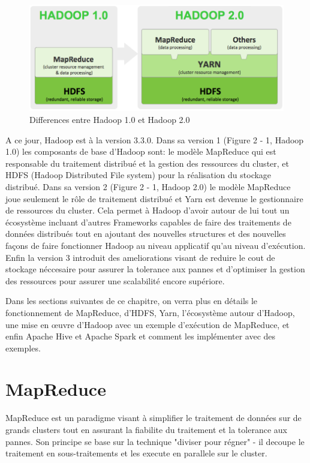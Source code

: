 \documentclass[12pt,french]{book}
\begin{document}
	\newpage
	\begin{figure}[t]
		\centering
		\includegraphics[width=\linewidth]{hadoop1vshadoop2}
		\caption[Differences entre Hadoop 1.0 et Hadoop 2.0]{Differences entre Hadoop 1.0 et Hadoop 2.0\footnotemark}
	\end{figure}


A ce jour, Hadoop est à la version 3.3.0.
Dans sa version 1 (Figure 2 - 1, Hadoop 1.0) les composants de base d’Hadoop sont: le modèle MapReduce qui est responsable du traitement distribué et la gestion des ressources du cluster, et HDFS (Hadoop Distributed File system) pour la réalisation du stockage distribué.
Dans sa version 2 (Figure 2 - 1, Hadoop 2.0) le modèle MapReduce joue seulement le rôle de traitement distribué et Yarn est devenue le gestionnaire de ressources du cluster.
Cela permet à Hadoop d'avoir autour de lui tout un écosystème incluant d’autres Frameworks capables de faire des traitements de données distribués tout en ajoutant des nouvelles structures et des nouvelles façons de faire fonctionner Hadoop au niveau applicatif qu’au niveau d’exécution.
Enfin la version 3 introduit des ameliorations visant de reduire le cout de stockage néccesaire pour assurer la tolerance aux pannes et d'optimiser la gestion des ressources pour assurer une scalabilité encore supériore.

Dans les sections suivantes de ce chapitre, on verra plus en détails le fonctionnement de MapReduce, d’HDFS, Yarn, l’écosystème autour d’Hadoop, une mise en œuvre d’Hadoop avec un exemple d’exécution de MapReduce, et enfin Apache Hive et Apache Spark et comment les implémenter avec des exemples.

	\section{MapReduce}
MapReduce est un paradigme visant à simplifier le traitement de données sur de grands clusters tout en assurant la fiabilite du traitement et la tolerance aux pannes.
Son principe se base sur la technique "diviser pour régner" - il decoupe le traitement en sous-traitements et les execute en parallele sur le cluster.
\end{document}
